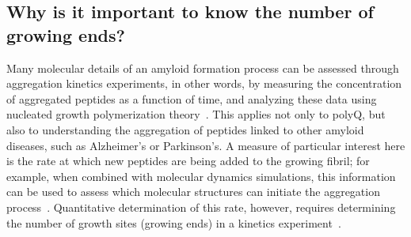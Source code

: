 \documentclass[a4paper,11pt,floatfix,authordate1-4,twocolumn]{revtex4-1}
\begin{document}
\subsection{Why is it important to know the number of growing ends?}
Many molecular details of  an amyloid formation process
can be assessed through aggregation kinetics experiments,
in other words, by measuring the concentration of aggregated peptides
as  a function of time,
and analyzing these data using nucleated growth polymerization theory~\cite{Ferrone:1999a}.
%
This applies not only to polyQ, but also to
understanding the aggregation of peptides linked to
other amyloid diseases, such as Alzheimer's or Parkinson's.
%
%
A measure of particular interest here is
the rate at which new peptides are being added to the growing fibril;
%
for example, when combined with molecular dynamics simulations, this
information can be used to assess which molecular structures can initiate the
aggregation process~\cite{Miettinen:2014a}.
%
Quantitative determination of this rate, however, requires determining the number
of growth sites (growing ends) in a kinetics experiment~\cite{Ferrone:1999a}.
\end{document}
